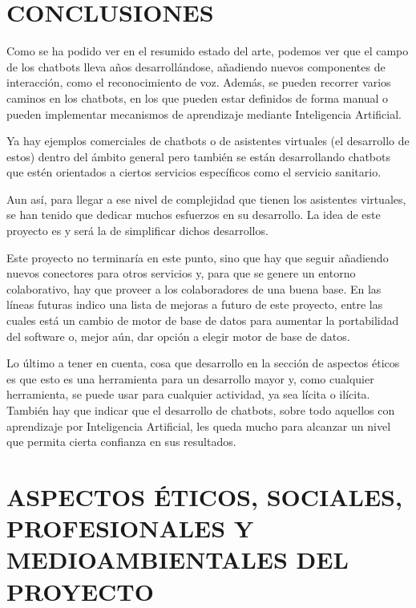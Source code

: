 \documentclass[spanish,12pt, a4paper, twoside]{paper}
\let\oldsection\section
\def\section{\cleardoublepage\oldsection}
\begin{document}
\section{CONCLUSIONES}

Como se ha podido ver en el resumido estado del arte, podemos ver que el campo de los chatbots lleva años desarrollándose, añadiendo nuevos componentes de interacción, como el reconocimiento de voz. Además, se pueden recorrer varios caminos en los chatbots, en los que pueden estar definidos de forma manual o pueden implementar mecanismos de aprendizaje mediante Inteligencia Artificial.
\newline

Ya hay ejemplos comerciales de chatbots o de asistentes virtuales (el desarrollo de estos) dentro del ámbito general pero también se están desarrollando chatbots que estén orientados a ciertos servicios específicos como el servicio sanitario.
\newline

Aun así, para llegar a ese nivel de complejidad que tienen los asistentes virtuales, se han tenido que dedicar muchos esfuerzos en su desarrollo. La idea de este proyecto es y será la de simplificar dichos desarrollos.
\newline

Este proyecto no terminaría en este punto, sino que hay que seguir añadiendo nuevos conectores para otros servicios y, para que se genere un entorno colaborativo, hay que proveer a los colaboradores de una buena base. En las líneas futuras indico una lista de mejoras a futuro de este proyecto, entre las cuales está un cambio de motor de base de datos para aumentar la portabilidad del software o, mejor aún, dar opción a elegir motor de base de datos.
\newline

Lo último a tener en cuenta, cosa que desarrollo en la sección de aspectos éticos es que esto es una herramienta para un desarrollo mayor y, como cualquier herramienta, se puede usar para cualquier actividad, ya sea lícita o ilícita. También hay que indicar que el desarrollo de chatbots, sobre todo aquellos con aprendizaje por Inteligencia Artificial, les queda mucho para alcanzar un nivel que permita cierta confianza en sus resultados.

\section{ASPECTOS ÉTICOS, SOCIALES, PROFESIONALES Y MEDIOAMBIENTALES DEL PROYECTO}
\end{document}
